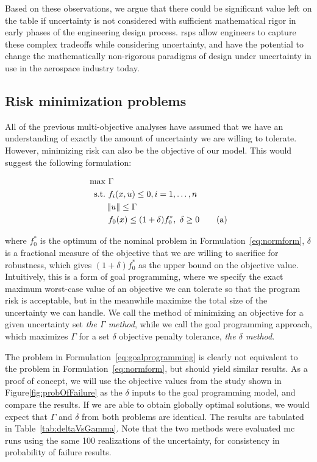 Based on these observations, we argue that there could be significant value left on the table
if uncertainty is not considered with sufficient mathematical rigor in early phases of
the engineering design process. \gls{rsp}s allow engineers to capture these complex
tradeoffs while considering uncertainty, and have the potential to change
the mathematically non-rigorous paradigms of design under uncertainty in use
in the aerospace industry today.

\subsection{Risk minimization problems}

All of the previous multi-objective analyses have assumed that we have an
understanding of exactly the amount of uncertainty we are
willing to tolerate. However, minimizing risk can also be the objective of our
model. This would suggest the following formulation:

\begin{align*}
    \text{max} &~\Gamma \\
    \text{s.t.}     &~f_i(x,u) \leq 0, i = 1,\ldots,n \\
                    & \left\lVert u\right\rVert \leq \Gamma \\
                    &~f_0(x) \leq (1+\delta)f_0^*,~\delta \geq 0 \tag{a}
    \label{eq:goalprogramming}
\end{align*}

where $f_0^*$ is the optimum of the nominal problem in Formulation~\ref{eq:normform}, $\delta$
is a fractional measure of the objective that we are willing to sacrifice for robustness, which
gives $(1+\delta)f_0^*$ as the upper bound on the objective value. Intuitively,
this is a form of goal programming,
where we specify the exact maximum worst-case value of an objective we can tolerate so that the program
risk is acceptable, but in the meanwhile maximize the total size of the uncertainty we can handle.
We call the method of minimizing an objective for a given uncertainty set \emph{the $\Gamma$ method},
while we call the goal programming approach, which maximizes $\Gamma$ for a set $\delta$ objective penalty tolerance,
\emph{the $\delta$ method}.

The problem in Formulation~\ref{eq:goalprogramming} is clearly
not equivalent to the problem in Formulation~\ref{eq:normform},
but should yield similar results. As a proof of concept, we will use the objective values from the study
shown in Figure\ref{fig:probOfFailure} as the $\delta$ inputs to the goal programming model, and compare the results.
If we are able to obtain globally
optimal solutions, we would expect that $\Gamma$ and $\delta$  from both problems are identical. The results are tabulated in
Table~\ref{tab:deltaVsGamma}. Note that the two methods were evaluated \gls{mc} runs using the same 100 realizations
of the uncertainty, for consistency in probability of failure results.

